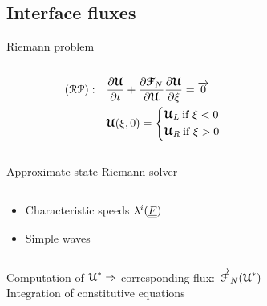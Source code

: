 \subsection{Interface fluxes}
\begin{frame}
  \begin{block}{Riemann problem}
    \begin{columns}
      \begin{column}{0.5\textwidth}
        \begin{footnotesize}
          \begin{align*}
          (\mathcal{R}\mathcal{P}): \quad &\frac{\partial {\boldsymbol{\mathcal{U}}}}{\partial t} + \frac{\partial {\boldsymbol{\mathcal{F}}}_N}{\partial {\boldsymbol{\mathcal{U}}}} \frac{\partial {\boldsymbol{\mathcal{U}}}}{\partial \xi }= {\overrightarrow{0}} \\ 
                          & {\boldsymbol{\mathcal{U}}}(\xi,0) = \left\lbrace 
                            \begin{aligned}
                              & {\boldsymbol{\mathcal{U}}}_L \: \text{if } \xi < 0 \\
                              & {\boldsymbol{\mathcal{U}}}_R \: \text{if } \xi > 0 
                            \end{aligned} \right.
          \end{align*}
        \end{footnotesize}
      \end{column}
      \begin{column}{0.3\textwidth}
        
      \end{column}
    \end{columns}
  \end{block}
  \vspace{-0.4cm}
  \begin{footnotesize}
    \begin{block}{Approximate-state Riemann solver \cite{Toro}}
      \begin{columns}
        \begin{column}{0.3\textwidth}
          \begin{itemize}
          \item Characteristic speeds $\lambda^i({\underline{\underline{F}}})$
          \item Simple waves
          \end{itemize}
        \end{column}  
        \begin{column}{0.55\textwidth}
          
        \end{column}
      \end{columns}
    \end{block}
    Computation of ${\boldsymbol{\mathcal{U}}}^* \Rightarrow$ corresponding flux: ${\overrightarrow{\mathcal{F}}}_N({\boldsymbol{\mathcal{U}}}^*)$ \cite{Godunov_method}\\
    \alert{Integration of constitutive equations}
    
  \end{footnotesize}
  \vspace{-0.4cm}
 \end{frame}

